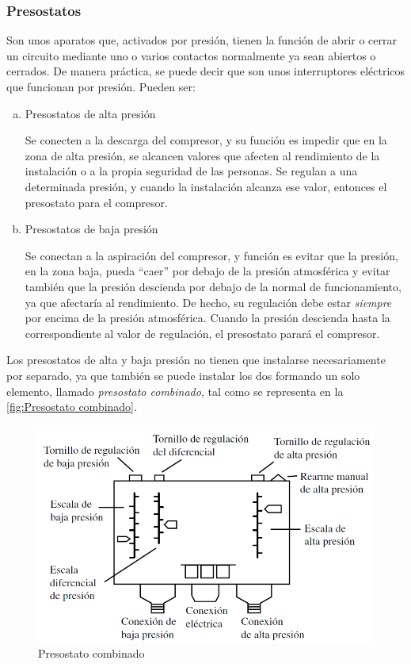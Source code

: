 \subsubsection{Presostatos}

Son unos aparatos que, activados por presión, tienen la función de abrir o cerrar un circuito mediante uno o varios contactos normalmente ya sean abiertos o cerrados. De manera práctica, se puede decir que son unos interruptores eléctricos que funcionan por presión. Pueden ser:

\begin{enumerate}
	[a.]
	\item Presostatos de alta presión 
	
	Se conecten a la descarga del compresor, y su función es impedir que en la zona de alta presión, se alcancen valores que afecten al rendimiento de la instalación o a la propia seguridad de las personas. Se regulan a una determinada presión, y cuando la instalación alcanza ese valor, entonces el presostato para el compresor.
	\item Presostatos de baja presión
	
	Se conectan a la aspiración del compresor, y función es evitar que la presión, en la zona baja, pueda ``caer'' por debajo de la presión atmosférica y evitar también que la presión descienda por debajo de la normal de funcionamiento, ya que afectaría al rendimiento. De hecho, su regulación debe estar \textit{siempre} por encima de la presión atmosférica. Cuando la presión descienda hasta la correspondiente al valor de regulación, el presostato parará el compresor. 
\end{enumerate}

Los presostatos de alta y baja presión no tienen que instalarse necesariamente por separado, ya que también se puede instalar los dos formando un solo elemento, llamado \textit{presostato combinado}, tal como se representa en la \autoref{fig:Presostato combinado}.

\begin{figure}[H]
	\centering
	\includegraphics[width=\textwidth]{figuras/presostato combinado.png}
	\caption{Presostato combinado}
	\label{fig:Presostato combinado}
\end{figure}

